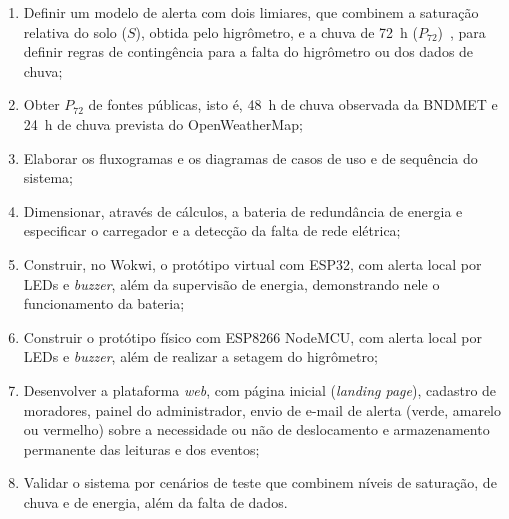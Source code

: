 \begin{enumerate}[label=\alph*)]

    \item Definir um modelo de alerta com dois limiares, que combinem a
    saturação relativa do solo ($S$), obtida pelo higrômetro, e a chuva
    de 72~h ($P_{72}$)~\cite{mirus2018developing}, para definir regras de
    contingência para a falta do higrômetro ou dos dados de chuva;

    \item Obter $P_{72}$ de fontes públicas, isto é, 48~h de chuva
    observada da BNDMET e 24~h de chuva prevista do OpenWeatherMap;

    \item Elaborar os fluxogramas e os diagramas de casos de uso e de
    sequência do sistema;

    \item Dimensionar, através de cálculos, a bateria de redundância de
    energia e especificar o carregador e a detecção da falta de rede
    elétrica;

    \item Construir, no Wokwi, o protótipo virtual com ESP32, com alerta
    local por LEDs e \textit{buzzer}, além da supervisão de energia,
    demonstrando nele o funcionamento da bateria;

    \item Construir o protótipo físico com ESP8266 NodeMCU, com alerta
    local por LEDs e \textit{buzzer}, além de realizar a setagem do
    higrômetro;

    \item Desenvolver a plataforma \textit{web}, com página inicial
    (\textit{landing page}), cadastro de moradores, painel do
    administrador, envio de e-mail de alerta (verde, amarelo ou
    vermelho) sobre a necessidade ou não de deslocamento e armazenamento
    permanente das leituras e dos eventos;

    \item Validar o sistema por cenários de teste que combinem níveis
    de saturação, de chuva e de energia, além da falta de dados.

\end{enumerate}
